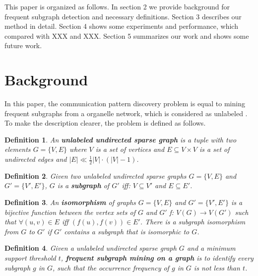 \documentclass[9pt,oneside]{article}
\newtheorem{defi}{Definition}
\begin{document}




This paper is organized as follows. In section 2 we provide background for frequent subgraph detection and necessary definitions. Section 3 describes our method in detail. Section 4 shows some experiments and performance, which compared with XXX and XXX. Section 5 summarizes our work and shows some future work.

\section{Background}
In this paper, the communication pattern discovery problem is equal to mining frequent subgraphs from a organelle network, which is considered as unlabeled . To make the description clearer, the problem is defined as follows. 
\begin{defi}
An \textbf{unlabeled undirected sparse graph} is a tuple with two elements $G=\{V,E\}$ where $V$ is a set of vertices and $E \subseteq V \times V$ is a set of undirected edges and $|E| \ll \frac{1}{2}|V|\cdot(|V|-1)$.
\end{defi}
\begin{defi}
Given two unlabeled undirected sparse graphs $G=\{V,E\}$ and $G'=\{V',E'\}$, $G$ is a \textbf{subgraph} of $G'$ iff: $V \subseteq V'$ and $E \subseteq E'$. 
\end{defi}
\begin{defi}
An \textbf{isomorphism} of graphs $G=\{V,E\}$ and $G'=\{V',E'\}$ is a bijective function between the vertex sets of $G$ and $G'$ f: $V(G) \longrightarrow V(G')$ such that $\forall(u,v) \in E$ iff $(f(u), f(v)) \in E'$. There is a subgraph isomorphism from $G$ to $G'$ if  $G'$ contains a subgraph that is isomorphic to $G$. 
\end{defi}
\begin{defi}
Given a unlabeled undirected sparse graph $G$ and a minimum support threshold $t$, \textbf{frequent subgraph mining on a graph} is to identify every subgraph $g$ in $G$, such that the occurrence frequency of $g$ in $G$ is not less than $t$.
\end{defi}
\end{document}

